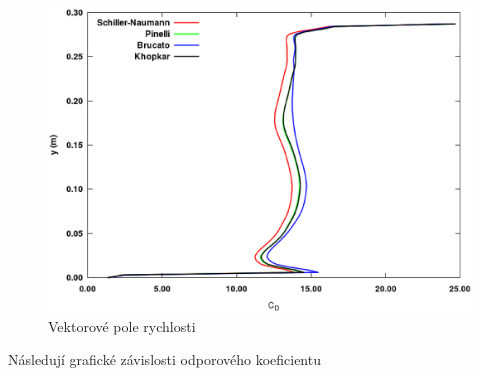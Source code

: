 \vspace{-12mm}

\begin{figure}[h!]
\begin{center}
\includegraphics[scale=0.47]{images/CD-6.eps}
\caption{Vektorové pole rychlosti}
\label{fig:cd6}
\end{center}
\end{figure} 

\vspace{-9mm}

Následují grafické závislosti odporového koeficientu 

